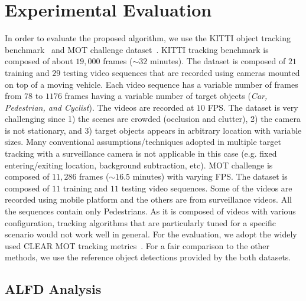 \documentclass[10pt,twocolumn,letterpaper]{article}
\begin{document}
\section{Experimental Evaluation}
\label{sec:exp}
In order to evaluate the proposed algorithm, we use the KITTI object tracking benchmark~\cite{Geiger2012CVPR} and MOT challenge dataset~\cite{MOTChallenge}.
KITTI tracking benchmark is composed of about $19,000$ frames ($\sim32$ minutes). The dataset is composed of $21$ training and $29$ testing video sequences that are recorded using cameras mounted on top of a moving vehicle. Each video sequence has a variable number of frames from $78$ to $1176$ frames having a variable number of target objects (\emph{Car, Pedestrian, and Cyclist}). The videos are recorded at $10$ FPS. The dataset is very challenging since 1) the scenes are crowded (occlusion and clutter), 2) the camera is not stationary, and 3) target objects appears in arbitrary location with variable sizes. Many conventional assumptions/techniques adopted in multiple target tracking with a surveillance camera is not applicable in this case (e.g. fixed entering/exiting location, background subtraction, etc).
MOT challenge is composed of $11,286$ frames ($\sim16.5$ minutes) with varying FPS. The dataset is composed of $11$ training and $11$ testing video sequences. Some of the videos are recorded using mobile platform and the others are from surveillance videos. All the sequences contain only Pedestrians. As it is composed of videos with various configuration, tracking algorithms that are particularly tuned for a specific scenario would not work well in general.   
For the evaluation, we adopt the widely used CLEAR MOT tracking metrics~\cite{keni2008evaluating}. For a fair comparison to the other methods, we use the reference object detections provided by the both datasets. 

\subsection{ALFD Analysis}
\label{sec:exp:alfd}
\end{document}
